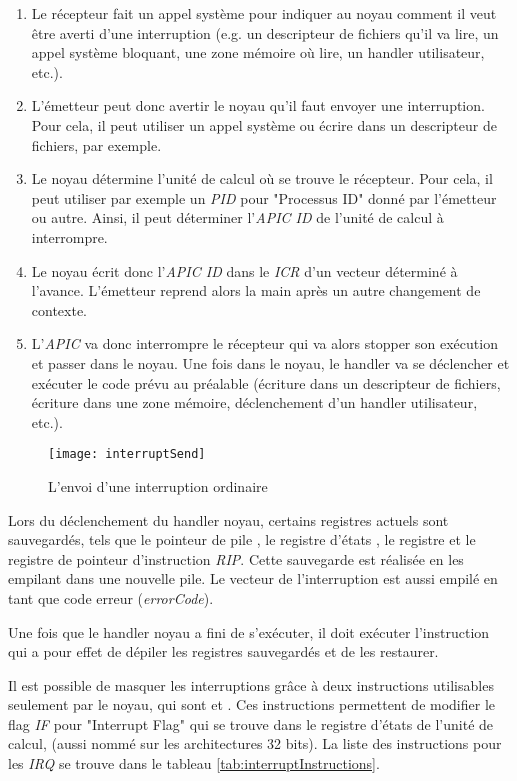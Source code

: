 \begin{enumerate}[label=\protect\circled{\arabic*}]
  \item Le récepteur fait un appel système pour indiquer au noyau comment il veut être averti d'une interruption (e.g. un descripteur de fichiers qu'il va lire, un appel système bloquant, une zone mémoire où lire, un handler utilisateur, etc.).
  \item L'émetteur peut donc avertir le noyau qu'il faut envoyer une interruption.
  Pour cela, il peut utiliser un appel système ou écrire dans un descripteur de fichiers, par exemple.
  \item Le noyau détermine l'unité de calcul où se trouve le récepteur.
  Pour cela, il peut utiliser par exemple un \emph{PID} pour "Processus ID" donné par l'émetteur ou autre.
  Ainsi, il peut déterminer l'\emph{APIC ID} de l'unité de calcul à interrompre.
  \item Le noyau écrit donc l'\emph{APIC ID} dans le \emph{ICR} d'un vecteur déterminé à l'avance.
  L'émetteur reprend alors la main après un autre changement de contexte.
  \item L'\emph{APIC} va donc interrompre le récepteur qui va alors stopper son exécution et passer dans le noyau.
  Une fois dans le noyau, le handler va se déclencher et exécuter le code prévu au préalable (écriture dans un descripteur de fichiers, écriture dans une zone mémoire, déclenchement d'un handler utilisateur, etc.).
\end{enumerate}

\begin{figure}[H]
  \texttt{[image: interruptSend]}
  \caption{L'envoi d'une interruption ordinaire}
  \label{fig:sendInt}
\end{figure}

Lors du déclenchement du handler noyau, certains registres actuels sont sauvegardés,
tels que le pointeur de pile ,
le registre d'états ,
le registre  et le registre de pointeur d'instruction \emph{RIP}.
Cette sauvegarde est réalisée en les empilant dans une nouvelle pile.
Le vecteur de l'interruption est aussi empilé en tant que code erreur (\emph{errorCode}).

Une fois que le handler noyau a fini de s'exécuter,
il doit exécuter l'instruction  qui a pour effet de dépiler les registres sauvegardés et de les restaurer.

Il est possible de masquer les interruptions grâce à deux instructions utilisables seulement par le noyau,
qui sont  et .
Ces instructions permettent de modifier le flag \emph{IF} pour "Interrupt Flag" qui se trouve dans le registre d'états de l'unité de calcul,
 (aussi nommé  sur les architectures 32 bits).
La liste des instructions pour les \emph{IRQ} se trouve dans le tableau \ref{tab:interruptInstructions}.

